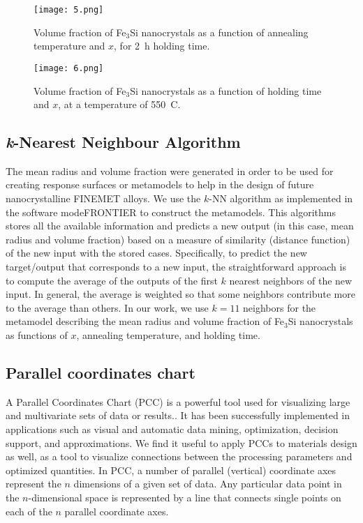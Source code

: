 \begin{figure}[ht]
\centering
\texttt{[image: 5.png]}
\caption{Volume fraction of Fe$_3$Si nanocrystals as a function of annealing temperature and $x$, for 2~h holding time.\cite{CITRINE}}
\label{Volume_fraction_3D_Temp_X}
\end{figure}



\begin{figure}[ht]
\centering
\texttt{[image: 6.png]}
\caption{Volume fraction of Fe$_3$Si nanocrystals as a function of holding time and $x$, at a temperature of 550~\degree C.\cite{CITRINE}}
\label{Volume_fraction_3D_Time_X}
\end{figure}


\subsection{\emph{k}-Nearest Neighbour Algorithm}\label{method_KNN}
The mean radius and volume fraction were generated in order to be used for creating response surfaces or metamodels to help
in the design of future
nanocrystalline FINEMET alloys.
We use the $k$-NN algorithm\cite{K_NN_Algorithm} as implemented in the software modeFRONTIER\cite{modeFRONTIER} to construct the metamodels.
This algorithms stores all the available information and predicts a new output (in this case, mean radius and volume fraction) based on a
measure of similarity (distance function) of the new input with the stored cases. Specifically, to predict the
new target/output that corresponds to a new input,
the straightforward approach is to compute the average of the outputs of the first $k$ nearest neighbors of the new input.
In general, the average is weighted so that some neighbors contribute more to the average than others.
In our work, we use $k = 11$ neighbors for the  metamodel describing the mean radius and volume fraction of Fe$_3$Si nanocrystals as functions of $x$,  annealing temperature, and holding time.

\subsection{Parallel coordinates chart}
A Parallel Coordinates Chart (PCC)\cite{PCC} is  a powerful tool used for
visualizing large and multivariate sets of data or results.\cite{PCC}.
It has been successfully implemented in applications such as visual and automatic data mining,
optimization, decision support, and approximations.\cite{PCC}
We find it useful to apply PCCs to materials design as well,
as a tool to visualize connections between the processing
parameters and optimized quantities.
In PCC, a number of parallel (vertical) coordinate axes
represent the $n$ dimensions of a given set of data.
Any particular data point in the $n$-dimensional space is represented by a line that connects single points
on each of the $n$ parallel coordinate axes.

